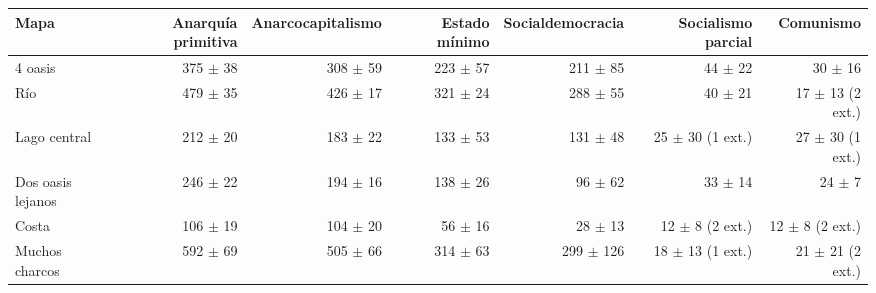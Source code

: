 \begin{tabular}{lrrrrrr}
\toprule
Mapa & Anarquía primitiva & Anarcocapitalismo & Estado mínimo & Socialdemocracia & Socialismo parcial & Comunismo \\
\midrule
4 oasis & 375 $\pm$ 38 & 308 $\pm$ 59 & 223 $\pm$ 57 & 211 $\pm$ 85 & 44 $\pm$ 22 & 30 $\pm$ 16 \\
Río & 479 $\pm$ 35 & 426 $\pm$ 17 & 321 $\pm$ 24 & 288 $\pm$ 55 & 40 $\pm$ 21 & 17 $\pm$ 13 (2 ext.) \\
Lago central & 212 $\pm$ 20 & 183 $\pm$ 22 & 133 $\pm$ 53 & 131 $\pm$ 48 & 25 $\pm$ 30 (1 ext.) & 27 $\pm$ 30 (1 ext.) \\
Dos oasis lejanos & 246 $\pm$ 22 & 194 $\pm$ 16 & 138 $\pm$ 26 & 96 $\pm$ 62 & 33 $\pm$ 14 & 24 $\pm$ 7 \\
Costa & 106 $\pm$ 19 & 104 $\pm$ 20 & 56 $\pm$ 16 & 28 $\pm$ 13 & 12 $\pm$ 8 (2 ext.) & 12 $\pm$ 8 (2 ext.) \\
Muchos charcos & 592 $\pm$ 69 & 505 $\pm$ 66 & 314 $\pm$ 63 & 299 $\pm$ 126 & 18 $\pm$ 13 (1 ext.) & 21 $\pm$ 21 (2 ext.) \\
\bottomrule
\end{tabular}
